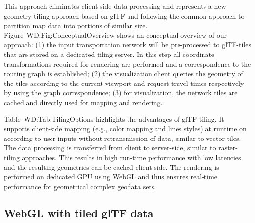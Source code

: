       This approach eliminates client-side data processing and represents a new geometry-tiling
      approach based on glTF and following the common approach to partition map data
      into portions of similar size. Figure~{WD:Fig:ConceptualOverview} shows an conceptual
      overview of our approach: (1) the input transportation network will be pre-processed
      to glTF-tiles that are stored on a dedicated tiling server. In this step all
      coordinate transformations required for rendering are performed and a correspondence
      to the routing graph is established; (2) the visualization client queries the
      geometry of the tiles according to the current viewport and request travel times
      respectively by using the graph correspondence; (3) for visualization, the network
      tiles are cached and directly used for mapping and rendering.\par
      Table~{WD:Tab:TilingOptions} highlights the advantages of glTF-tiling. It
      supports client-side mapping (e.g., color mapping and lines styles) at runtime
      on according to user inputs without retransmission of data, similar to vector
      tiles. The data processing is transferred from client to server-side, similar
      to raster-tiling approaches. This results in high run-time performance with
      low latencies and the resulting geometries can be cached client-side. The
      rendering is performed on dedicated GPU using WebGL and thus ensures real-time
      performance for geometrical complex geodata sets.\par


    \subsection{WebGL with tiled glTF data}
